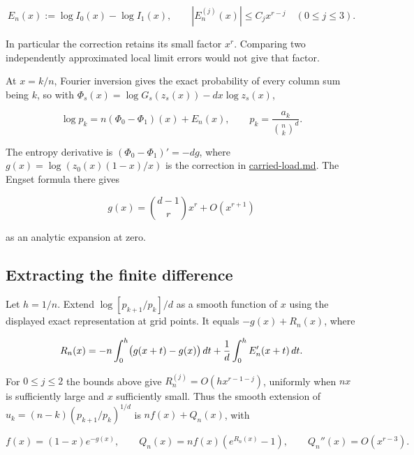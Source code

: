 \documentclass[11pt]{article}
\begin{document}
\begin{equation*}
E_n(x):=\log I_0(x)-\log I_1(x), \qquad
|E_n^{(j)}(x)|\le C_j x^{r-j}\quad (0\le j\le3).
\end{equation*}

In particular the correction retains its small factor $x^r$. Comparing two independently approximated local limit errors would not give that factor.

At $x=k/n$, Fourier inversion gives the exact probability of every column sum being $k$, so with $\Phi_s(x)=\log G_s(z_s(x))-dx\log z_s(x)$,

\begin{equation*}
\log p_k=n(\Phi_0-\Phi_1)(x)+E_n(x), \qquad p_k=\frac{a_k}{\binom nk^d}.
\end{equation*}

The entropy derivative is $(\Phi_0-\Phi_1)'=-dg$, where $g(x)=\log(z_0(x)(1-x)/x)$ is the correction in \href{https://github.com/ProgramComputer/open-math-research/blob/27e3e70d6603e8a395c5fdb7ff944922bce83380/topics/balanced-arrays/engset-curvature/carried-load.md}{carried-load.md}. The Engset formula there gives

\begin{equation*}
g(x)=\binom{d-1}{r}x^r+O(x^{r+1})
\end{equation*}

as an analytic expansion at zero.

\subsection{Extracting the finite difference}

Let $h=1/n$. Extend $\log[p_{k+1}/p_k]/d$ as a smooth function of $x$ using the displayed exact representation at grid points. It equals $-g(x)+R_n(x)$, where

\begin{equation*}
R_n(x)=-n\int_0^h\bigl(g(x+t)-g(x)\bigr)\thinspace dt
+\frac1d\int_0^h E_n'(x+t)\thinspace dt.
\end{equation*}

For $0\le j\le2$ the bounds above give $R_n^{(j)}=O(hx^{r-1-j})$, uniformly when $nx$ is sufficiently large and $x$ sufficiently small. Thus the smooth extension of $u_k=(n-k)(p_{k+1}/p_k)^{1/d}$ is $n f(x)+Q_n(x)$, with

\begin{equation*}
f(x)=(1-x)e^{-g(x)}, \qquad
Q_n(x)=n f(x)(e^{R_n(x)}-1), \qquad Q_n''(x)=O(x^{r-3}).
\end{equation*}
\end{document}
